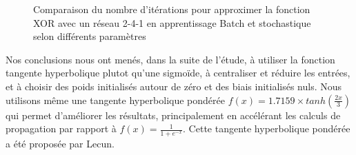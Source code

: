 \documentclass[
    10pt,
    a4paper,
    oneside,
    headinclude,footinclude,
    BCOR=5mm,
    captions=tableabove
]{scrartcl}
\begin{document}
\begin{figure}[H]
\centering
{}
\newline
{}
\caption{Comparaison du nombre d'itérations pour approximer la fonction XOR avec un réseau 2-4-1 en apprentissage Batch et stochastique selon différents paramètres}
\end{figure}

Nos conclusions nous ont menés, dans la suite de l'étude, à utiliser la fonction tangente hyperbolique plutot qu'une sigmoïde, à centraliser et réduire les entrées, et à choisir des poids initialisés autour de zéro et des biais initialisés nuls.
Nous utilisons même une tangente hyperbolique pondérée $f(x) = 1.7159 \times tanh(\frac{2x}{3})$ qui permet d'améliorer les résultats, principalement en accélérant les calculs de propagation par rapport à $f(x) = \frac{1}{1 + e^{-x}}$. Cette tangente hyperbolique pondérée a été proposée par Lecun. %
\end{document}
